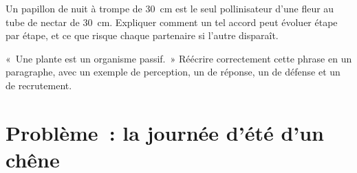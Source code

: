 \begin{exercise}[$\star\star\star$]\label{exo:g12:plant-rooted-life:14}
Un papillon de nuit à trompe de \qty{30}{cm} est le seul pollinisateur
d'une fleur au tube de nectar de \qty{30}{cm}. Expliquer comment un
tel accord peut évoluer étape par étape, et ce que risque chaque
partenaire si l'autre disparaît.
\end{exercise}

\begin{exercise}[$\star\star\star$]\label{exo:g12:plant-rooted-life:15}
«~Une plante est un organisme passif.~» Réécrire correctement cette
phrase en un paragraphe, avec un exemple de perception, un de réponse,
un de défense et un de recrutement.
\end{exercise}

\section{Problème~: la journée d'été d'un chêne}

